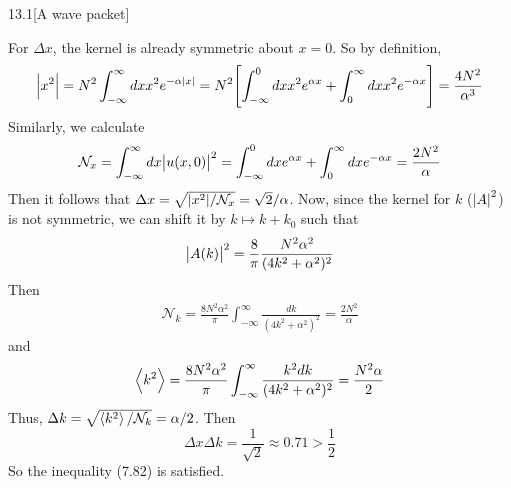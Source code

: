 \documentclass[12pt]{article}
\begin{document}
\begin{problem}{13.1}[A wave packet]
\begin{solution}
For $\Delta x$, the kernel is already symmetric about $x=0$. So by definition,
\begin{equation}
    \abs{x^2}=N^2\int_{-\infty}^\infty dx x^2e^{-\alpha\abs{x}}
    =N^2\qty[\int_{-\infty}^0 dxx^2e^{\alpha x}+\int_0^\infty dxx^2e^{-\alpha
    x}]=\frac{4N^2}{\alpha^3}
\end{equation}
Similarly, we calculate
\begin{equation}
    \mathcal{N}_x=\int_{-\infty}^\infty dx\abs{u(x,0)}^2
    =\int_{-\infty}^0dx e^{\alpha x}+\int_0^\infty dxe^{-\alpha x}
    =\frac{2N^2}{\alpha} 
\end{equation}
Then it follows that $\Delta x=\sqrt{\abs{x^2}/\mathcal{N}_x}=\sqrt2/\alpha$.
Now, since the kernel for $k$ ($\abs{A}^2$) is not symmetric, we can shift it by
$k\mapsto k+k_0$ such that
\begin{equation}
    \abs{A(k)}^2=\frac8\pi\frac{N^2\alpha^2}{(4k^2+\alpha^2)^2} 
\end{equation}
Then
\begin{align}
    \mathcal{N}_k=\frac{8N^2\alpha^2}{\pi}\int_{-\infty}^\infty\frac{dk}{(4k^2+\alpha^2)^2}=\frac{2N^2}{\alpha} 
\end{align}
and
\begin{align}
    \expval{k^2}
    =\frac{8N^2\alpha^2}{\pi}\int_{-\infty}^\infty\frac{k^2dk}{(4k^2+\alpha^2)^2}
    =\frac{N^2\alpha}{2}
\end{align}
Thus, $\Delta k=\sqrt{\expval{k^2}/\mathcal{N}_k}=\alpha/2$. Then
\begin{equation}
    \Delta x\Delta k=\frac1{\sqrt2}\approx0.71>\frac12 
\end{equation}
So the inequality (7.82) is satisfied.
\end{solution}
\end{problem}
\end{document}
